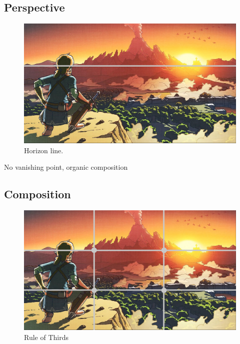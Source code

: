 \documentclass{cup-pan}
\begin{document}
        \subsection{Perspective}
            \begin{figure}[H]
                \includegraphics[width=\textwidth]{Imagenes/Referencias/Analisis_ConceptArt/horizonte.png}
                \caption{Horizon line.}
            \end{figure}

            No vanishing point, organic composition

        \subsection{Composition}
            \begin{figure}[H]
                \includegraphics[width=\textwidth]{Imagenes/Referencias/Analisis_ConceptArt/tercios.png}
                \caption{Rule of Thirds}
            \end{figure}
\end{document}
